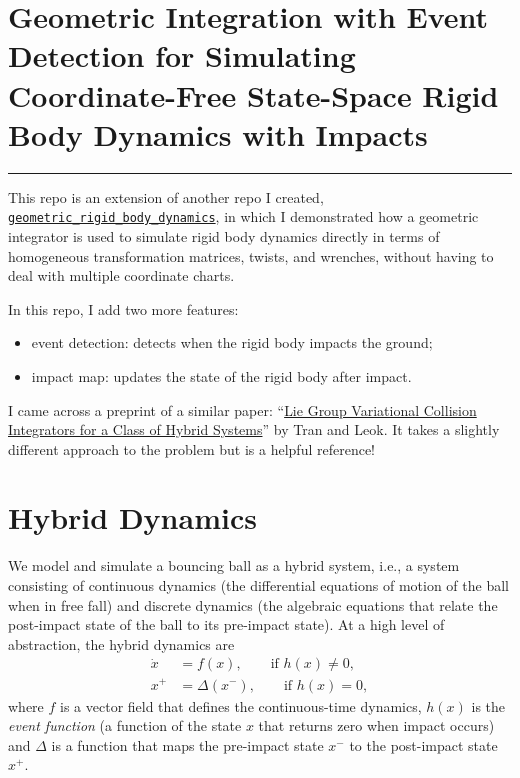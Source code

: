 \documentclass[]{article}
\newcommand{\colvec}[1]{\mathbf{#1}}
\theoremstyle{definition}
\theoremstyle{remark}
\newcommand{\ie}{i.e., }
\begin{document}


\section*{Geometric Integration with Event Detection for Simulating Coordinate-Free State-Space Rigid Body Dynamics with Impacts}
\noindent\hrule
\medskip
This repo is an extension of another repo I created, \href{https://github.com/dlynch7/geometric_rigid_body_dynamics}{\texttt{geometric\_rigid\_body\_dynamics}}, in which I demonstrated how a geometric integrator is used to simulate rigid body dynamics directly in terms of homogeneous transformation matrices, twists, and wrenches, without having to deal with multiple coordinate charts.

In this repo, I add two more features:
\begin{itemize}
	\item event detection: detects when the rigid body impacts the ground;
	\item impact map: updates the state of the rigid body after impact.
\end{itemize}

I came across a preprint of a similar paper: ``\href{https://mathweb.ucsd.edu/~mleok/pdf/TrLe2023_collisions.pdf}{Lie Group Variational Collision Integrators for a Class of Hybrid Systems}'' by Tran and Leok. It takes a slightly different approach to the problem but is a helpful reference!

\section{Hybrid Dynamics}
We model and simulate a bouncing ball as a hybrid system, \ie a system consisting of continuous dynamics (the differential equations of motion of the ball when in free fall) and discrete dynamics (the algebraic equations that relate the post-impact state of the ball to its pre-impact state).
At a high level of abstraction, the hybrid dynamics are
\begin{subequations}
\begin{align}
	\dot{x} &= f(x),\qquad\textrm{if }h(x) \neq 0,\\
	x^{+} &= \Delta(x^{-}),\qquad\textrm{if }h(x) = 0,
\end{align}
\end{subequations}
where $f$ is a vector field that defines the continuous-time dynamics, $h(x)$ is the \textit{event function} (a function of the state $x$ that returns zero when impact occurs) and $\Delta$ is a function that maps the pre-impact state $x^{-}$ to the post-impact state $x^{+}$.
\end{document}

